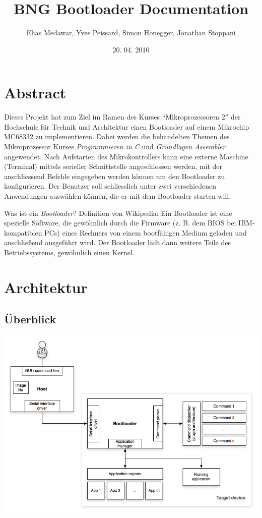 \documentclass[letterpaper,10pt,ngerman]{manual}
\title{BNG Bootloader Documentation}
\date{20. 04. 2010}
\author{Elias Medawar, Yves Peissard, Simon Honegger, Jonathan Stoppani}
\begin{document}
\maketitle
\tableofcontents
\hypertarget{--doc-index}{}

\hypertarget{todo-2}{}
\resetcurrentobjects
\hypertarget{--doc-abstract}{}

\chapter{Abstract}

Dieses Projekt hat zum Ziel im Ramen des Kurses ``Mikroprozessoren 2''
der Hochschule für Technik und Architektur einen Bootloader auf einem
Mikrochip MC68332 zu implementieren. Dabei werden die behandelten Themen
des Mikroprozessor Kurses \emph{Programmieren in C} und \emph{Grundlagen Assembler}
angewendet. Nach Aufstarten des Mikrokontrollers kann eine externe Maschine
(Terminal) mittels serieller Schnittstelle angeschlossen werden, mit der
anschliessend Befehle eingegeben werden können um den Bootloader zu
konfigurieren. Der Benutzer soll schliesslich unter zwei verschiedenen
Anwendungen auswählen können, die er mit dem Bootloader starten will.

Was ist ein \emph{Bootloader}?
Definition von Wikipedia: Ein Bootloader ist eine spezielle Software, die gewöhnlich durch
die Firmware  (z. B. dem BIOS bei IBM-kompatiblen PCs) eines Rechners von
einem bootfähigen Medium geladen und anschließend ausgeführt wird. Der
Bootloader lädt dann weitere Teile des Betriebssystems, gewöhnlich einen
Kernel.

\resetcurrentobjects
\hypertarget{--doc-architecture/index}{}

\chapter{Architektur}


\section{Überblick}

\includegraphics{overview.png}
\end{document}

